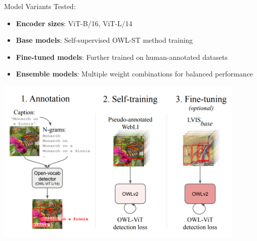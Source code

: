 \documentclass[aspectratio=43]{beamer}
\begin{document}
\begin{frame}
\begin{columns}
        \begin{column}{0.5\textwidth}
            \begin{exampleblock}{\tiny Model Variants Tested:}
                \tiny
                \begin{itemize}
                    \item \textbf{Encoder sizes}: ViT-B/16, ViT-L/14
                    \item \textbf{Base models}: Self-supervised OWL-ST method training
                    \item \textbf{Fine-tuned models}: Further trained on human-annotated datasets
                    \item \textbf{Ensemble models}: Multiple weight combinations for balanced performance
                \end{itemize}
            \end{exampleblock}
            \begin{center}
                \includegraphics[width=0.9\textwidth]{Imgs/OWLv2.png}
            \end{center}
        \end{column}
    \end{columns}
\end{frame}
\end{document}

